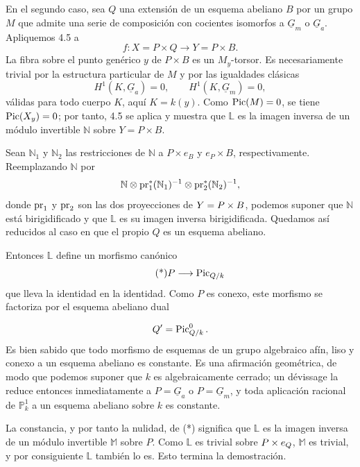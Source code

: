 En el segundo caso, sea $Q$ una extensión de un esquema abeliano $B$
por un grupo $M$ que admite una serie de composición con cocientes
isomorfos a $\underline G_m$ o $\underline G_a$. Apliquemos 4.5 a
\[
 f:X=P\times Q\longrightarrow Y=P\times B.
\]
La fibra sobre el punto genérico $y$ de $P\times B$ es un
$M_y$-torsor. Es necesariamente trivial por la estructura particular
de $M$ y por las igualdades clásicas
\[
 H^1(K,\underline G_a)=0,
 \qquad
 H^1(K,\underline G_m)=0,
\]
válidas para todo cuerpo $K$, aquí $K=k(y)$. Como $\Pic(M)=0$, se
tiene $\Pic(X_y)=0$; por tanto, 4.5 se aplica y muestra que $\mathbb L$
es la imagen inversa de un módulo invertible $\mathbb N$ sobre
$Y=P\times B$.

Sean $\mathbb N_1$ y $\mathbb N_2$ las restricciones de $\mathbb N$
a $P\times e_B$ y $e_P\times B$, respectivamente. Reemplazando
$\mathbb N$ por
\[
 \mathbb N\otimes\pr_1^*(\mathbb N_1)^{-1}
 \otimes\pr_2^*(\mathbb N_2)^{-1},
\]
donde $\pr_1$ y $\pr_2$ son las dos proyecciones de
$Y=P\times\sisi{A}{B}$, podemos suponer que $\mathbb N$ está
birigidificado y que $\mathbb L$ es su imagen inversa
birigidificada. Quedamos así reducidos al caso en que el propio $Q$ es
un esquema abeliano.

Entonces $\mathbb L$ define un morfismo canónico
\begin{equation}\tag{*}
 P\longrightarrow\underline{\Pic}_{Q/k}
\end{equation}
que lleva la identidad en la identidad. Como $P$ es conexo, este
morfismo se factoriza por el esquema abeliano dual


\[
 Q'=\underline{\Pic}^{0}_{Q/k}.
\]
Es bien sabido que todo morfismo de esquemas de un grupo algebraico
afín, liso y conexo a un esquema abeliano es constante. Es una
afirmación geométrica, de modo que podemos suponer que $k$ es
algebraicamente cerrado; un dévissage la reduce entonces
inmediatamente a $P=\underline G_a$ o $P=\underline G_m$, y toda
aplicación racional de $\mathbb P^1_k$ a un esquema abeliano sobre $k$
es constante.

La constancia, y por tanto la nulidad, de (*) significa que
$\mathbb L$ es la imagen inversa de un módulo invertible $\mathbb M$
sobre $P$. Como $\mathbb L$ es trivial sobre
$P\times e_{\sisi{A}{Q}}$, $\mathbb M$ es trivial, y por consiguiente
$\mathbb L$ también lo es. Esto termina la demostración.

